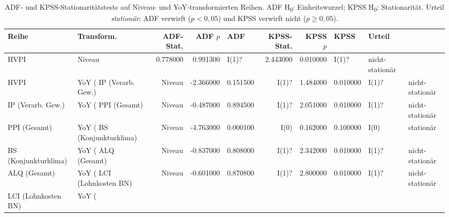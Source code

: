 \begin{table}
\caption{ADF- und KPSS-Stationaritätstests auf Niveau- und YoY-transformierten Reihen. ADF H\textsubscript{0}: Einheitswurzel; KPSS H\textsubscript{0}: Stationarität. Urteil \emph{stationär}: ADF verwirft ($p<0{,}05$) und KPSS verwirft nicht ($p\geq0{,}05$).}
\label{tab:stationaritaet}
\begin{tabular}{llrrlrrll}
\toprule
Reihe & Transform. & ADF-Stat. & ADF $p$ & ADF & KPSS-Stat. & KPSS $p$ & KPSS & Urteil \\
\midrule
HVPI & Niveau & 0.778000 & 0.991300 & I(1)? & 2.443000 & 0.010000 & I(1)? & nicht-stationär \\
HVPI & YoY (%
IP (Verarb. Gew.) & Niveau & -2.366000 & 0.151500 & I(1)? & 1.484000 & 0.010000 & I(1)? & nicht-stationär \\
IP (Verarb. Gew.) & YoY (%
PPI (Gesamt) & Niveau & -0.487000 & 0.894500 & I(1)? & 2.051000 & 0.010000 & I(1)? & nicht-stationär \\
PPI (Gesamt) & YoY (%
BS (Konjunkturklima) & Niveau & -4.763000 & 0.000100 & I(0) & 0.162000 & 0.100000 & I(0) & stationär \\
BS (Konjunkturklima) & YoY (%
ALQ (Gesamt) & Niveau & -0.837000 & 0.808000 & I(1)? & 2.342000 & 0.010000 & I(1)? & nicht-stationär \\
ALQ (Gesamt) & YoY (%
LCI (Lohnkosten BN) & Niveau & -0.601000 & 0.870800 & I(1)? & 2.800000 & 0.010000 & I(1)? & nicht-stationär \\
LCI (Lohnkosten BN) & YoY (%
\bottomrule
\end{tabular}
\end{table}
